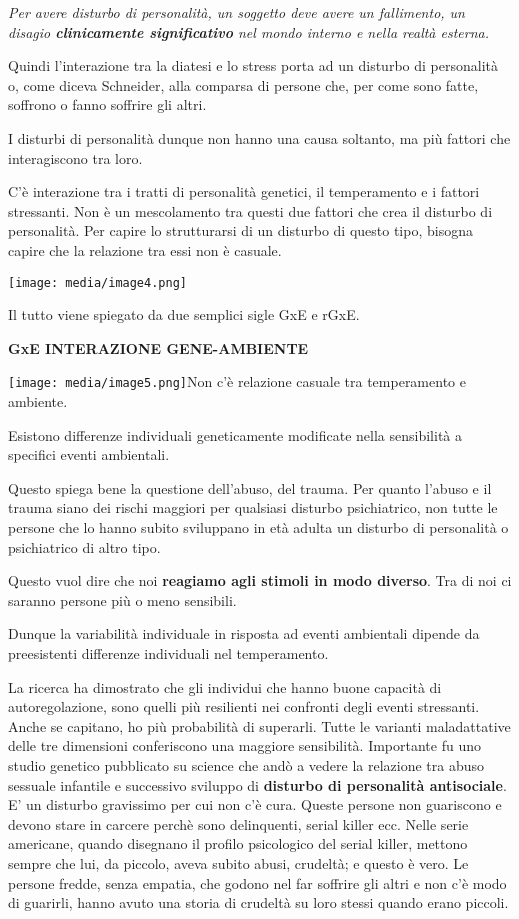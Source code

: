 \documentclass[]{article}
\begin{document}
\emph{Per avere disturbo di personalità, un soggetto deve avere un
fallimento, un disagio \textbf{clinicamente significativo} nel mondo
interno e nella realtà esterna. }

Quindi l'interazione tra la diatesi e lo stress porta ad un disturbo di
personalità o, come diceva Schneider, alla comparsa di persone che, per
come sono fatte, soffrono o fanno soffrire gli altri.

I disturbi di personalità dunque non hanno una causa soltanto, ma più
fattori che interagiscono tra loro.

C'è interazione tra i tratti di personalità genetici, il temperamento e
i fattori stressanti. Non è un mescolamento tra questi due fattori che
crea il disturbo di personalità. Per capire lo strutturarsi di un
disturbo di questo tipo, bisogna capire che la relazione tra essi non è
casuale.

\texttt{[image: media/image4.png]}

Il tutto viene spiegato da due semplici sigle GxE e rGxE.

\textbf{GxE INTERAZIONE GENE-AMBIENTE}

\texttt{[image: media/image5.png]}Non
c'è relazione casuale tra temperamento e ambiente.

Esistono differenze individuali geneticamente modificate nella
sensibilità a specifici eventi ambientali.

Questo spiega bene la questione dell'abuso, del trauma. Per quanto
l'abuso e il trauma siano dei rischi maggiori per qualsiasi disturbo
psichiatrico, non tutte le persone che lo hanno subito sviluppano in età
adulta un disturbo di personalità o psichiatrico di altro tipo.

Questo vuol dire che noi \textbf{reagiamo agli stimoli in modo diverso}.
Tra di noi ci saranno persone più o meno sensibili.

Dunque la variabilità individuale in risposta ad eventi ambientali
dipende da preesistenti differenze individuali nel temperamento.

La ricerca ha dimostrato che gli individui che hanno buone capacità di
autoregolazione, sono quelli più resilienti nei confronti degli eventi
stressanti. Anche se capitano, ho più probabilità di superarli. Tutte le
varianti maladattative delle tre dimensioni conferiscono una maggiore
sensibilità. Importante fu uno studio genetico pubblicato su science che
andò a vedere la relazione tra abuso sessuale infantile e successivo
sviluppo di \textbf{disturbo di personalità antisociale}. E' un disturbo
gravissimo per cui non c'è cura. Queste persone non guariscono e devono
stare in carcere perchè sono delinquenti, serial killer ecc. Nelle serie
americane, quando disegnano il profilo psicologico del serial killer,
mettono sempre che lui, da piccolo, aveva subito abusi, crudeltà; e
questo è vero. Le persone fredde, senza empatia, che godono nel far
soffrire gli altri e non c'è modo di guarirli, hanno avuto una storia di
crudeltà su loro stessi quando erano piccoli.
\end{document}
